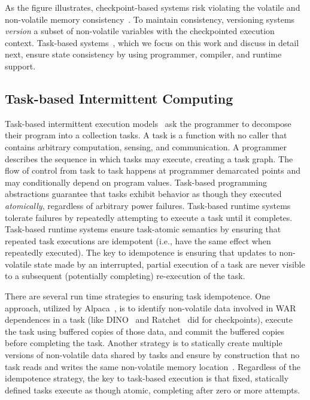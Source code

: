 As the figure illustrates, checkpoint-based systems risk violating the volatile and non-volatile memory consistency~\cite{dino}. To maintain consistency, versioning systems~\cite{dino,ratchet} {\em version} a subset of non-volatile variables with the checkpointed execution context. Task-based systems~\cite{chain,alpaca}, which we focus on this work and discuss in detail next, ensure state consistency by using programmer, compiler, and runtime support.

\subsection{Task-based Intermittent Computing}
\label{section:background_task_computing}

Task-based intermittent execution models~\cite{dino,chain,alpaca} ask the programmer to decompose their program into a collection tasks. A task is a function with no caller that contains arbitrary computation, sensing, and communication. A programmer describes the sequence in which tasks may execute, creating a task graph. The flow of control from task to task happens at programmer demarcated points and may conditionally depend on program values. Task-based programming abstractions guarantee that tasks exhibit behavior as though they executed {\em atomically}, regardless of arbitrary power failures. Task-based runtime systems tolerate failures by repeatedly attempting to execute a task until it completes. Task-based runtime systems ensure task-atomic semantics by ensuring that repeated task executions are idempotent (i.e., have the same effect when repeatedly executed). The key to idempotence is ensuring that updates to non-volatile state made by an interrupted, partial execution of a task are never visible to a subsequent (potentially completing) re-execution of the task.  

There are several run time strategies to ensuring task idempotence. One approach, utilized by Alpaca~\cite{alpaca}, is to identify non-volatile data involved in WAR dependences in a task (like DINO~\cite{dino} and Ratchet~\cite{ratchet} did for checkpoints), execute the task using buffered copies of those data, and commit the buffered copies before completing the task. Another strategy is to statically create multiple versions of non-volatile data shared by tasks and ensure by construction that no task reads and writes the same non-volatile memory location~\cite{chain}. Regardless of the idempotence strategy, the key to task-based execution is that fixed, statically defined tasks execute as though atomic, completing after zero or more attempts. 

